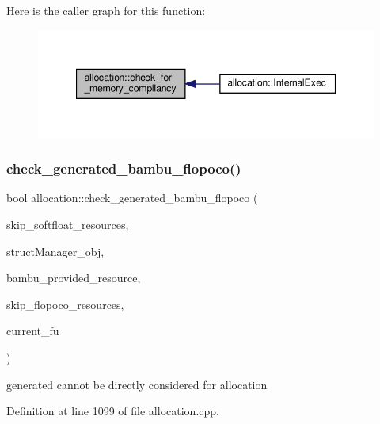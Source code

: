 Here is the caller graph for this function\+:
\nopagebreak
\begin{figure}[H]
\begin{center}
\leavevmode
\includegraphics[width=347pt]{d0/d74/classallocation_abcfa5870832b4b9d8d194054d7b2f86b_icgraph}
\end{center}
\end{figure}
\mbox{\label{classallocation_ad0e5db03715e2282b6d3d78507bcf6fb}} 
\subsubsection{\texorpdfstring{check\+\_\+generated\+\_\+bambu\+\_\+flopoco()}{check\_generated\_bambu\_flopoco()}}
{\footnotesize\ttfamily bool allocation\+::check\+\_\+generated\+\_\+bambu\+\_\+flopoco (\begin{DoxyParamCaption}\item[{bool}]{skip\+\_\+softfloat\+\_\+resources,  }\item[{\hyperlink{structural__manager_8hpp_ab3136f0e785d8535f8d252a7b53db5b5}{structural\+\_\+manager\+Ref}}]{struct\+Manager\+\_\+obj,  }\item[{std\+::string \&}]{bambu\+\_\+provided\+\_\+resource,  }\item[{bool}]{skip\+\_\+flopoco\+\_\+resources,  }\item[{\hyperlink{technology__node_8hpp_a33dd193b7bd6b987bf0d8a770a819fa7}{technology\+\_\+node\+Ref}}]{current\+\_\+fu }\end{DoxyParamCaption})\hspace{0.3cm}{\ttfamily [protected]}}

generated cannot be directly considered for allocation 

Definition at line 1099 of file allocation.\+cpp.



